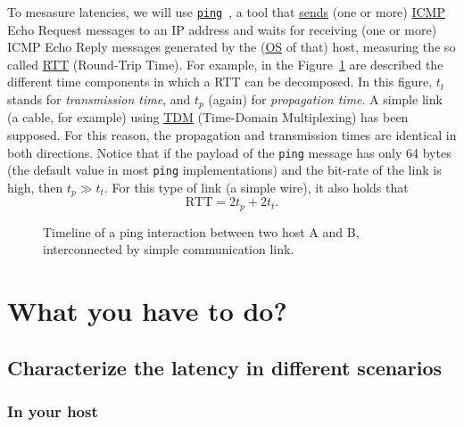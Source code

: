 To mesasure latencies, we will use
\href{https://github.com/torvalds/linux/blob/master/net/ipv4/ping.c}{\texttt{ping}}~\cite{Kurose-Ross,Forouzan},
a tool that
\href{https://en.wikipedia.org/wiki/Ping_(networking_utility)}{sends}
(one or more)
\href{https://en.wikipedia.org/wiki/Internet_Control_Message_Protocol}{ICMP}
Echo Request messages to an IP address and waits for receiving (one or
more) ICMP Echo Reply messages generated by the
(\href{https://en.wikipedia.org/wiki/Operating_system}{OS} of that)
host, measuring the so called
\href{https://en.wikipedia.org/wiki/Round-trip_delay}{RTT} (Round-Trip
Time). For example, in the Figure~\ref{fig:ping_timeline} are
described the different time components in which a RTT can be
decomposed. In this figure, $t_t$ stands for \emph{transmission time},
and $t_p$ (again) for \emph{propagation time}. A simple link (a cable,
for example) using
\href{https://en.wikipedia.org/wiki/Time-division_multiple_access}{TDM}
(Time-Domain Multiplexing) has been supposed. For this reason, the
propagation and transmission times are identical in both
directions. Notice that if the payload of the \verb|ping| message has
only 64 bytes (the default value in most \verb|ping| implementations)
and the bit-rate of the link is high, then $t_p\gg t_t.$ For this type
of link (a simple wire), it also holds that
\begin{equation}
  \text{RTT} = 2t_p + 2t_t.
  \label{eq:RTT}
\end{equation}
  
\begin{figure}
  \begin{center}
  \end{center}
  \caption{Timeline of a ping interaction between two host A and B,
    interconnected by simple communication link.}
  \label{fig:ping_timeline}
\end{figure}

\section{What you have to do?}
\label{sec:homework}

\subsection{Characterize the latency in different scenarios}

\subsubsection{In your host}

